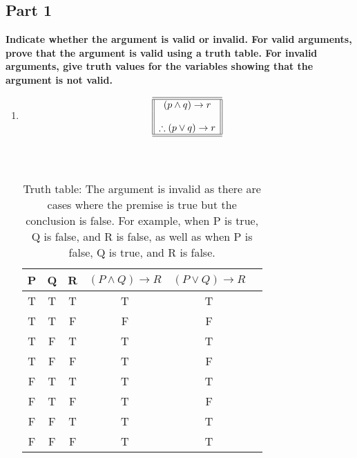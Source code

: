 \documentclass{amsart}
\theoremstyle{definition}
\theoremstyle{Exercise}
\theoremstyle{remark}
\theoremstyle{rule}
\numberwithin{equation}{section}
\begin{document}
\subsection*{Part 1}
{\bf Indicate whether the argument is valid or invalid. For valid arguments, prove that the argument is valid using a truth table. For invalid arguments, give truth values for the variables showing that the argument is not valid.}\\
 \begin{enumerate}

\item \[
\begin{array}{||c||}
\hline \hline
(p \land q) \to r\\
\\
\therefore (p \lor q) \to r\\
\hline \hline
\end{array}
\]\\\\
     \begin{table}[h]
    \centering
    \begin{tabular}{cccccc}
    \toprule
    P & Q & R & $(P \land Q) \rightarrow R$ & $(P \lor Q) \rightarrow R$ \\
    \midrule
    T & T & T & T                           & T                          \\
    T & T & F & F                           & F                          \\
    T & F & T & T                           & T                          \\
    T & F & F & T                           & F                          \\
    F & T & T & T                           & T                          \\
    F & T & F & T                           & F                          \\
    F & F & T & T                           & T                          \\
    F & F & F & T                           & T                          \\
    \bottomrule
    \end{tabular}
    \caption{Truth table: The argument is invalid as there are cases where the premise is true but the conclusion is false. For example, when P is true, Q is false, and R is false, as well as when P is false, Q is true, and R is false.}
    \label{tab:truth_table_part1}
    \end{table}
 \\\\
   \end{enumerate}
\end{document}

